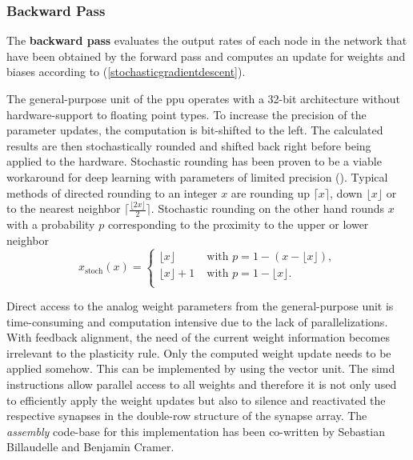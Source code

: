 \subsubsection*{Backward Pass}
The \textbf{backward pass} evaluates the output rates of each node in the network that have been obtained by the forward pass and computes an update for weights and biases according to  (\cref{stochasticgradientdescent}).

The general-purpose unit of the \gls{ppu} operates with a 32-bit architecture without hardware-support to floating point types. To increase the precision of the parameter updates, the computation is bit-shifted to the left. The calculated results are then stochastically rounded and shifted back right before being applied to the hardware. Stochastic rounding has been proven to be a viable workaround for deep learning with parameters of limited precision (\citealp{limitedprecisionpaper}). Typical methods of directed rounding to an integer $x$ are rounding up $\lceil x\rceil$, down $\lfloor x\rfloor$ or to the nearest neighbor $\lceil\frac{\lfloor2x\rfloor}{2}\rceil$. Stochastic rounding on the other hand rounds $x$ with a probability $p$ corresponding to the proximity to the upper or lower neighbor
\begin{equation*}
x_\text{stoch}(x) = 
\begin{cases}
\lfloor x \rfloor \quad \quad &\text{with } p = 1 - (x - \lfloor x \rfloor), \\
\lfloor x \rfloor + 1 &\text{with } p = 1 - \lfloor x \rfloor. \\
\end{cases}
\end{equation*}

Direct access to the analog weight parameters from the general-purpose unit is time-consuming and computation intensive due to the lack of parallelizations. With feedback alignment, the need of the current weight information becomes irrelevant to the plasticity rule. Only the computed weight update needs to be applied somehow. This can be implemented by using the vector unit. The \gls{simd} instructions allow parallel access to all weights and therefore it is not only used to efficiently apply the weight updates but also to silence and reactivated the respective synapses in the double-row structure of the synapse array. The \emph{assembly} code-base for this implementation has been co-written by Sebastian Billaudelle and Benjamin Cramer.

